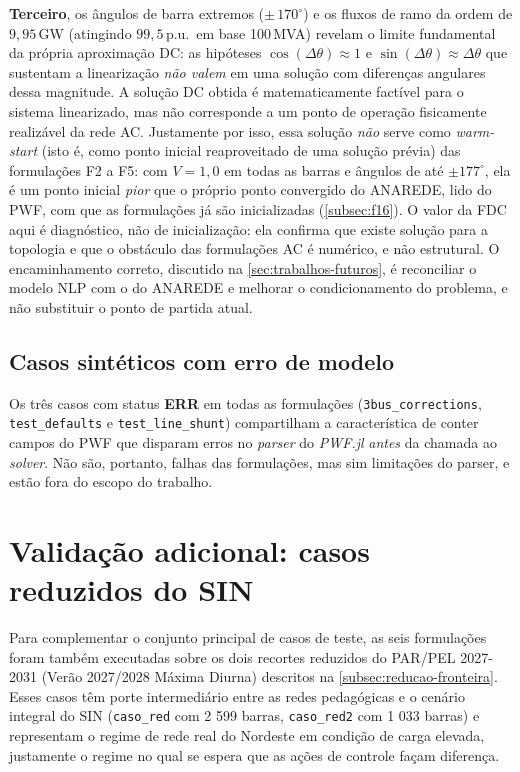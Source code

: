 \textbf{Terceiro}, os ângulos de barra extremos ($\pm$\,$170^\circ$) e os fluxos de ramo da ordem de $9{,}95$\,GW (atingindo $99{,}5$\,p.u.\ em base 100\,MVA) revelam o limite fundamental da própria aproximação DC: as hipóteses $\cos(\Delta\theta) \approx 1$ e $\sin(\Delta\theta) \approx \Delta\theta$ que sustentam a linearização \emph{não valem} em uma solução com diferenças angulares dessa magnitude. A solução DC obtida é matematicamente factível para o sistema linearizado, mas não corresponde a um ponto de operação fisicamente realizável da rede AC. Justamente por isso, essa solução \emph{não} serve como \textit{warm-start} (isto é, como ponto inicial reaproveitado de uma solução prévia) das formulações F2 a F5: com $V = 1{,}0$ em todas as barras e ângulos de até $\pm 177^\circ$, ela é um ponto inicial \emph{pior} que o próprio ponto convergido do ANAREDE, lido do PWF, com que as formulações já são inicializadas (\autoref{subsec:f16}). O valor da FDC aqui é diagnóstico, não de inicialização: ela confirma que existe solução para a topologia e que o obstáculo das formulações AC é numérico, e não estrutural. O encaminhamento correto, discutido na \autoref{sec:trabalhos-futuros}, é reconciliar o modelo NLP com o do ANAREDE e melhorar o condicionamento do problema, e não substituir o ponto de partida atual.

\subsection{Casos sintéticos com erro de modelo}
\label{subsec:sinteticos}

Os três casos com status \textbf{ERR} em todas as formulações (\texttt{3bus\_corrections}, \texttt{test\_defaults} e \texttt{test\_line\_shunt}) compartilham a característica de conter campos do PWF que disparam erros no \textit{parser} do \textit{PWF.jl} \emph{antes} da chamada ao \textit{solver}. Não são, portanto, falhas das formulações, mas sim limitações do parser, e estão fora do escopo do trabalho.

\section{Validação adicional: casos reduzidos do SIN}
\label{sec:casos-reduzidos}

Para complementar o conjunto principal de casos de teste, as seis formulações foram também executadas sobre os dois recortes reduzidos do PAR/PEL 2027-2031 (Verão 2027/2028 Máxima Diurna) descritos na \autoref{subsec:reducao-fronteira}. Esses casos têm porte intermediário entre as redes pedagógicas e o cenário integral do SIN (\texttt{caso\_red} com 2 599 barras, \texttt{caso\_red2} com 1 033 barras) e representam o regime de rede real do Nordeste em condição de carga elevada, justamente o regime no qual se espera que as ações de controle façam diferença.

